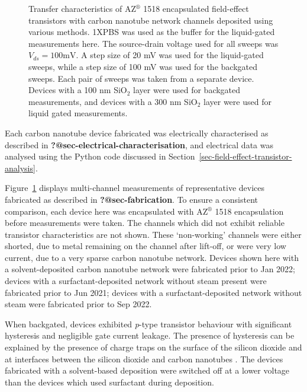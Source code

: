 \documentclass[
  a4paper,
]{scrbook}
\begin{document}
\begin{figure}
\begin{minipage}[t]{0.49\linewidth}
{{}

}

\end{minipage}%

\caption{\label{fig-pristine-cnt-characteristics}Transfer
characteristics of AZ\(^\circledR\) 1518 encapsulated field-effect
transistors with carbon nanotube network channels deposited using
various methods. 1XPBS was used as the buffer for the liquid-gated
measurements here. The source-drain voltage used for all sweeps was
\(V_{ds} = 100 \textrm{mV}\). A step size of 20 mV was used for the
liquid-gated sweeps, while a step size of 100 mV was used for the
backgated sweeps. Each pair of sweeps was taken from a separate device.
Devices with a 100 nm SiO\(_2\) layer were used for backgated
measurements, and devices with a 300 nm SiO\(_2\) layer were used for
liquid gated measurements.}

\end{figure}

Each carbon nanotube device fabricated was electrically characterised as
described in \textbf{?@sec-electrical-characterisation}, and electrical
data was analysed using the Python code discussed in
Section~\ref{sec-field-effect-transistor-analysis}.

Figure~\ref{fig-pristine-cnt-characteristics} displays multi-channel
measurements of representative devices fabricated as described in
\textbf{?@sec-fabrication}. To ensure a consistent comparison, each
device here was encapsulated with AZ\(^\circledR\) 1518 encapsulation
before measurements were taken. The channels which did not exhibit
reliable transistor characteristics are not shown. These `non-working'
channels were either shorted, due to metal remaining on the channel
after lift-off, or were very low current, due to a very sparse carbon
nanotube network. Devices shown here with a solvent-deposited carbon
nanotube network were fabricated prior to Jan 2022; devices with a
surfactant-deposited network without steam present were fabricated prior
to Jun 2021; devices with a surfactant-deposited network without steam
were fabricated prior to Sep 2022.

When backgated, devices exhibited \emph{p}-type transistor behaviour
with significant hysteresis and negligible gate current leakage. The
presence of hysteresis can be explained by the presence of charge traps
on the surface of the silicon dioxide and at interfaces between the
silicon dioxide and carbon nanotubes \autocite{Lee2007,Ha2014}. The
devices fabricated with a solvent-based deposition were switched off at
a lower voltage than the devices which used surfactant during
deposition.
\end{document}
